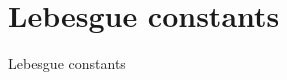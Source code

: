 \documentclass{beamer}
\begin{document}
\section{Lebesgue constants}
\begin{frame}{Lebesgue constants}
  \begin{center}
  \end{center}
\end{frame}
\end{document}
